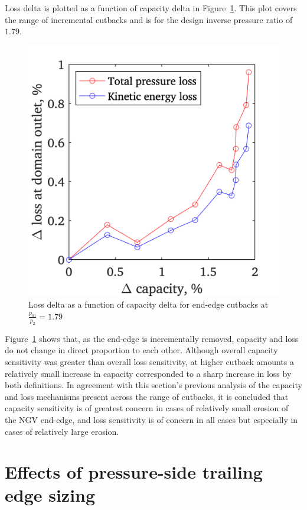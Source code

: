 \documentclass[a4paper, 11pt, oneside]{report}
\begin{document}
Loss delta is plotted as a function of capacity delta in Figure~\ref{fig:ss_capacities_vs_losses}. This plot covers the range of incremental cutbacks and is for the design inverse pressure ratio of $1.79$.

\begin{figure}[H]
	\centering
	\includegraphics[width=.45\textwidth]{figs/ss_capacities_vs_losses.png}
	\caption{Loss delta as a function of capacity delta for end-edge cutbacks at $\frac{p_{01}}{p_2}=1.79$}
    \label{fig:ss_capacities_vs_losses}
\end{figure}

Figure~\ref{fig:ss_capacities_vs_losses} shows that, as the end-edge is incrementally removed, capacity and loss do not change in direct proportion to each other. Although overall capacity sensitivity was greater than overall loss sensitivity, at higher cutback amounts a relatively small increase in capacity corresponded to a sharp increase in loss by both definitions. In agreement with this section's previous analysis of the capacity and loss mechanisms present across the range of cutbacks, it is concluded that capacity sensitivity is of greatest concern in cases of relatively small erosion of the NGV end-edge, and loss sensitivity is of concern in all cases but especially in cases of relatively large erosion.






\section{Effects of pressure-side trailing edge sizing}
\label{performance_of_an_alternative_trailing_edge_design}
\end{document}
